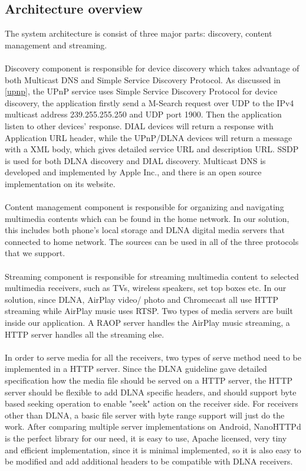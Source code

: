 \subsection{Architecture overview}
The system architecture is consist of three major parts: discovery, content
management and streaming.\\
\\
Discovery component is responsible for device discovery which takes advantage of
both Multicast DNS and Simple Service Discovery Protocol. As discussed in
\ref{upnp}, the UPnP service uses Simple Service Discovery Protocol for device
discovery, the application firstly send a M-Search request over UDP to the
IPv4 multicast address 239.255.255.250 and UDP port 1900. Then the application
listen to other devices' response. DIAL devices will return a response with
Application URL header, while the UPnP/DLNA devices will return a message with
a XML body, which gives detailed service URL and description URL. SSDP is used
for both DLNA discovery and DIAL discovery. Multicast DNS is developed and
implemented by Apple Inc., and there is an open source implementation on its
website.\\
\\
Content management component is responsible for organizing and
navigating multimedia contents which can be found in the home network. In our
solution, this includes both phone's local storage and DLNA digital media
servers that connected to home network. The sources can be used in all of the
three protocols that we support.\\
\\
Streaming component is responsible for streaming multimedia content to selected
multimedia receivers, such as TVs, wireless speakers, set top boxes etc. In our
solution, since DLNA, AirPlay video/ photo and Chromecast all use HTTP streaming
while AirPlay music uses RTSP. Two types of media servers are built inside our
application. A RAOP server handles the AirPlay music streaming, a HTTP server
handles all the streaming else.\\
\\
In order to serve media for all the receivers, two types of serve method need to
be implemented in a HTTP server. Since the DLNA guideline gave detailed
specification how the media file should be served on a HTTP server, the HTTP server should be
flexible to add DLNA specific headers, and should support byte based seeking
operation to enable "seek" action on the receiver side. For receivers other than
DLNA, a basic file server with byte range support will just do the work. After
comparing multiple server implementations on Android, NanoHTTPd is the perfect
library for our need, it is easy to use, Apache licensed, very tiny and
efficient implementation, since it is minimal implemented, so it is also easy to
be modified and add additional headers to be compatible with DLNA receivers.

